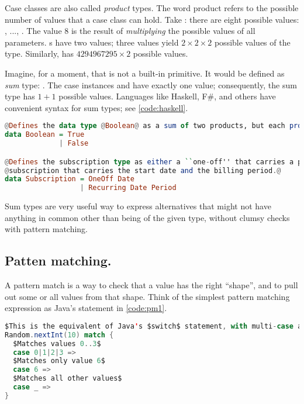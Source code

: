 \documentclass[10 pt]{article}
\begin{document}
Case classes are also called \emph{product} types. The word product refers to the possible number of values that a case class can hold. Take : there are eight possible values: , ..., . The value $8$ is the result of \emph{multiplying} the possible values of all parameters. s have two values; three  values yield $2 \times 2 \times 2$ possible values of the  type. Similarly,  has $4294967295 \times 2$ possible values. 

Imagine, for a moment, that  is not a built-in primitive. It would be defined as \emph{sum} type: . The case instances  and  have exactly one value; consequently, the sum type  has $1 + 1$ possible values. Languages like Haskell\cite{haskell}, F\#\cite{fsharp}, and others have convenient syntax for sum types; see \autoref{code:haskell}.

\begin{lstlisting}[caption={Taxonomy as sum type}, label={code:haskell}, language=Haskell, escapechar=@]
@Defines the data type @Boolean@ as a sum of two products, but each product only has one value.@
data Boolean = True   
             | False

@Defines the subscription type as either a ``one-off'' that carries a particular end-date, or a recurring@
@subscription that carries the start date and the billing period.@
data Subscription = OneOff Date 
                  | Recurring Date Period
\end{lstlisting}

Sum types are very useful way to express alternatives that might not have anything in common other than being of the given type, without clumsy  checks with pattern matching.

\subsection{Patten matching.} 
A pattern match is a way to check that a value has the right ``shape'', and to pull out some or all values from that shape. Think of the simplest pattern matching expression as Java's  statement in \autoref{code:pm1}.

\begin{lstlisting}[caption={Pattern matching}, label={code:pm1}, language=Scala, escapechar=$]
$This is the equivalent of Java's $switch$ statement, with multi-case and a default case.$
Random.nextInt(10) match {
  $Matches values 0..3$
  case 0|1|2|3 =>
  $Matches only value 6$
  case 6 =>
  $Matches all other values$
  case _ =>
}
\end{lstlisting}
\end{document}
